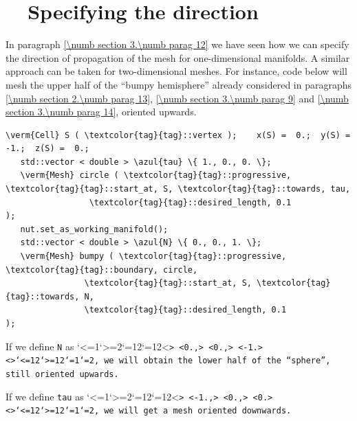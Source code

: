 \section{~~Specifying the direction}\label{\numb section 3.\numb parag 15}

In paragraph \ref{\numb section 3.\numb parag 12} we have seen how we can specify the direction
of propagation of the mesh for one-dimensional manifolds.
A similar approach can be taken for two-dimensional meshes.
For instance, code below will mesh the upper half of the ``bumpy hemisphere'' already considered
in paragraphs \ref{\numb section 2.\numb parag 13}, \ref{\numb section 3.\numb parag 9} and
\ref{\numb section 3.\numb parag 14}, oriented upwards.

\begin{Verbatim}[commandchars=\\\{\},formatcom=\small\tt,frame=single,
   label=parag-\ref{\numb section 3.\numb parag 15}.cpp,rulecolor=\color{coment},
   baselinestretch=0.94,framesep=2mm                                            ]
   \verm{Cell} S ( \textcolor{tag}{tag}::vertex );    x(S) =  0.;  y(S) = -1.;  z(S) =  0.;
   std::vector < double > \azul{tau} \{ 1., 0., 0. \};
   \verm{Mesh} circle ( \textcolor{tag}{tag}::progressive, \textcolor{tag}{tag}::start_at, S, \textcolor{tag}{tag}::towards, tau,
                 \textcolor{tag}{tag}::desired_length, 0.1                               );
   nut.set_as_working_manifold();
   std::vector < double > \azul{N} \{ 0., 0., 1. \};
   \verm{Mesh} bumpy ( \textcolor{tag}{tag}::progressive, \textcolor{tag}{tag}::boundary, circle,
                \textcolor{tag}{tag}::start_at, S, \textcolor{tag}{tag}::towards, N,
                \textcolor{tag}{tag}::desired_length, 0.1                 );
\end{Verbatim}

If we define {\small\tt N} as \catcode`<=1\catcode`>=2\catcode`{=12\catcode`}=12<\small\tt {>
<\small\tt 0.,> <\small\tt 0.,> <\small\tt -1.> <\small\tt }>\catcode`<=12\catcode`>=12\catcode`{=1\catcode`}=2, we will obtain
the lower half of the ``sphere'', still oriented upwards.

If we define {\small\tt tau} as \catcode`<=1\catcode`>=2\catcode`{=12\catcode`}=12<\small\tt {>
<\small\tt -1.,> <\small\tt 0.,> <\small\tt 0.> <\small\tt }>\catcode`<=12\catcode`>=12\catcode`{=1\catcode`}=2, we will get a mesh
oriented downwards.



